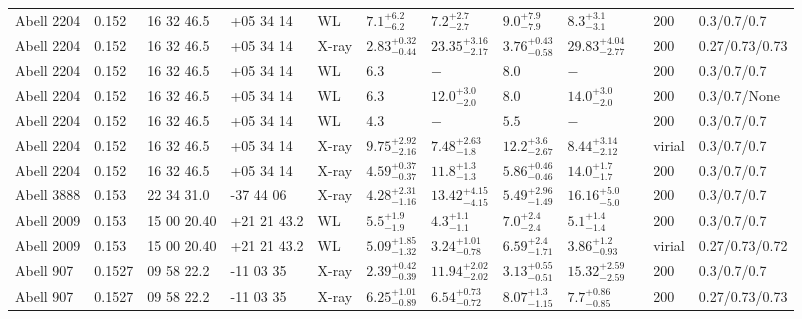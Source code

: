 \begin{landscape}
\begin{center}
{\begin{longtable}{llllllllllll}
Abell 2204 & 0.152 & 16 32 46.5 & +05 34 14 & WL & ${7.1}^{+6.2}_{-6.2}$ & ${7.2}^{+2.7}_{-2.7}$ & ${9.0}^{+7.9}_{-7.9}$ & ${8.3}^{+3.1}_{-3.1}$ & \citet{CO09.1} & 200 & 0.3/0.7/0.7 \\
Abell 2204 & 0.152 & 16 32 46.5 & +05 34 14 & X-ray & ${2.83}^{+0.32}_{-0.44}$ & ${23.35}^{+3.16}_{-2.17}$ & ${3.76}^{+0.43}_{-0.58}$ & ${29.83}^{+4.04}_{-2.77}$ & \citet{BA14.1} & 200 & 0.27/0.73/0.73 \\
Abell 2204 & 0.152 & 16 32 46.5 & +05 34 14 & WL & ${6.3}^{}_{}$ & ${-}^{}_{}$ & ${8.0}^{}_{}$ & ${-}^{}_{}$ & \citet{CL03.1} & 200 & 0.3/0.7/0.7 \\
Abell 2204 & 0.152 & 16 32 46.5 & +05 34 14 & WL & ${6.3}^{}_{}$ & ${12.0}^{+3.0}_{-2.0}$ & ${8.0}^{}_{}$ & ${14.0}^{+3.0}_{-2.0}$ & \citet{CL02.1} & 200 & 0.3/0.7/None \\
Abell 2204 & 0.152 & 16 32 46.5 & +05 34 14 & WL & ${4.3}^{}_{}$ & ${-}^{}_{}$ & ${5.5}^{}_{}$ & ${-}^{}_{}$ & \citet{CL01.1} & 200 & 0.3/0.7/0.7 \\
Abell 2204 & 0.152 & 16 32 46.5 & +05 34 14 & X-ray & ${9.75}^{+2.92}_{-2.16}$ & ${7.48}^{+2.63}_{-1.8}$ & ${12.2}^{+3.6}_{-2.67}$ & ${8.44}^{+3.14}_{-2.12}$ & \citet{SC07.1} & virial & 0.3/0.7/0.7 \\
Abell 2204 & 0.152 & 16 32 46.5 & +05 34 14 & X-ray & ${4.59}^{+0.37}_{-0.37}$ & ${11.8}^{+1.3}_{-1.3}$ & ${5.86}^{+0.46}_{-0.46}$ & ${14.0}^{+1.7}_{-1.7}$ & \citet{PO05.1} & 200 & 0.3/0.7/0.7 \\
Abell 3888 & 0.153 & 22 34 31.0 & -37 44 06 & X-ray & ${4.28}^{+2.31}_{-1.16}$ & ${13.42}^{+4.15}_{-4.15}$ & ${5.49}^{+2.96}_{-1.49}$ & ${16.16}^{+5.0}_{-5.0}$ & \citet{ET11.1} & 200 & 0.3/0.7/0.7 \\
Abell 2009 & 0.153 & 15 00 20.40 & +21 21 43.2 & WL & ${5.5}^{+1.9}_{-1.9}$ & ${4.3}^{+1.1}_{-1.1}$ & ${7.0}^{+2.4}_{-2.4}$ & ${5.1}^{+1.4}_{-1.4}$ & \citet{SE14.1} & 200 & 0.3/0.7/0.7 \\
Abell 2009 & 0.153 & 15 00 20.40 & +21 21 43.2 & WL & ${5.09}^{+1.85}_{-1.32}$ & ${3.24}^{+1.01}_{-0.78}$ & ${6.59}^{+2.4}_{-1.71}$ & ${3.86}^{+1.2}_{-0.93}$ & \citet{OK10.1} & virial & 0.27/0.73/0.72 \\
Abell 907 & 0.1527 & 09 58 22.2 & -11 03 35 & X-ray & ${2.39}^{+0.42}_{-0.39}$ & ${11.94}^{+2.02}_{-2.02}$ & ${3.13}^{+0.55}_{-0.51}$ & ${15.32}^{+2.59}_{-2.59}$ & \citet{ET11.1} & 200 & 0.3/0.7/0.7 \\
Abell 907 & 0.1527 & 09 58 22.2 & -11 03 35 & X-ray & ${6.25}^{+1.01}_{-0.89}$ & ${6.54}^{+0.73}_{-0.72}$ & ${8.07}^{+1.3}_{-1.15}$ & ${7.7}^{+0.86}_{-0.85}$ & \citet{BA14.1} & 200 & 0.27/0.73/0.73 \\

\end{longtable}}
\end{center}
\end{landscape}
